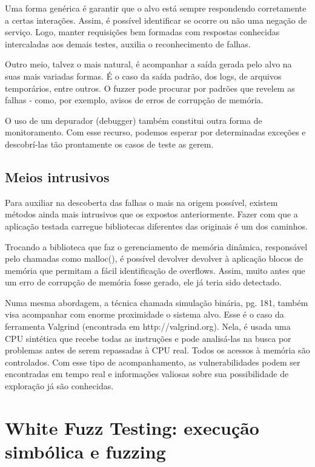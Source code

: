 		Uma forma genérica é garantir que o alvo está sempre respondendo corretamente
		a certas interações. Assim, é possível identificar se ocorre ou não uma negação
		de serviço. Logo, manter requisições bem formadas com respostas conhecidas intercaladas
		aos demais testes, auxilia o reconhecimento de falhas.	

		Outro meio, talvez o mais natural, é acompanhar a saída gerada pelo alvo na suas mais
		variadas formas. É o caso da saída padrão, dos logs, de arquivos temporários, entre outros.
		O fuzzer pode procurar por padrões que revelem as falhas - como, por exemplo, avisos
		de erros de corrupção de memória.


		O uso de um depurador (debugger) também constitui outra forma de monitoramento.
		Com esse recurso, podemos esperar por determinadas exceções e descobrí-las
		tão prontamente os casos de teste as gerem.
	
		
		\subsection{Meios intrusivos} 
			Para auxiliar na descoberta das falhas o mais na origem possível,
			existem métodos ainda mais intrusivos que os expostos anteriormente.
			Fazer com que a aplicação testada carregue bibliotecas diferentes das
			originais é um dos caminhos.
			

			Trocando a biblioteca que faz o gerenciamento de memória dinâmica, responsável
			pelo chamadas como malloc(), é possível devolver devolver à aplicação
			blocos de memória que permitam a fácil identificação de overflows. Assim,
			muito antes que um erro de corrupção de memória fosse gerado, ele já teria sido
			detectado.

			
			Numa mesma abordagem, a técnica chamada simulação binária, \cite{Ari2008} pg. 181,
			também visa acompanhar com enorme proximidade o sistema alvo.	
			Esse é o caso da ferramenta Valgrind (encontrada em http://valgrind.org).
			Nela, é usada uma CPU sintética que recebe todas as instruções e
			pode analisá-las na busca por problemas antes de serem repassadas à CPU real.
			Todos os acessos à memória são controlados.
			Com esse tipo de acompanhamento, as vulnerabilidades podem ser encontradas
			em tempo real e informações valiosas sobre sua possibilidade de exploração
			já são conhecidas.
			

	\section{White Fuzz Testing: execução simbólica e fuzzing}
	\label{sec:white_fuzz}
		
